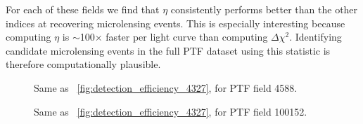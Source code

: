 \documentclass{emulateapj}
\begin{document}
For each of these fields we find that $\eta$ consistently performs better than the other indices at recovering microlensing events. This is especially interesting because computing $\eta$ is $\sim$100$\times$ faster per light curve than computing $\Delta\chi^2$. Identifying candidate microlensing events in the full PTF dataset using this statistic is therefore computationally plausible.
	


\begin{figure}
\centering
	
\caption{Same as \figurename~\ref{fig:detection_efficiency_4327}, for PTF field 4588.}\label{fig:detection_efficiency_4588}
\end{figure}

\begin{figure}
\centering
	
\caption{Same as \figurename~\ref{fig:detection_efficiency_4327}, for PTF field 100152.}\label{fig:detection_efficiency_100152}
\end{figure}
\end{document}
